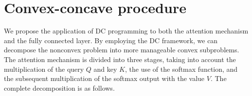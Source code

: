 \documentclass{ifacconf}
\begin{document}


\section{Convex-concave procedure}\label{sec:CCP}

We propose the application of DC programming to both the attention mechanism and the fully connected layer. By employing the DC framework, we can decompose the nonconvex problem into more manageable convex subproblems. The attention mechanism is divided into three stages, taking into account the multiplication of the query \(Q\) and key \(K\), the use of the softmax function, and the subsequent multiplication of the softmax output with the value \(V\). The complete decomposition is as follows.
\end{document}
